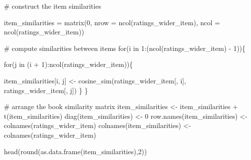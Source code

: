 \documentclass[
]{report}
\newenvironment{Shaded}{\begin{snugshade}}{\end{snugshade}}
\newcommand{\AttributeTok}[1]{\textcolor[rgb]{0.40,0.45,0.13}{#1}}
\newcommand{\CommentTok}[1]{\textcolor[rgb]{0.37,0.37,0.37}{#1}}
\newcommand{\ControlFlowTok}[1]{\textcolor[rgb]{0.00,0.23,0.31}{#1}}
\newcommand{\DecValTok}[1]{\textcolor[rgb]{0.68,0.00,0.00}{#1}}
\newcommand{\FunctionTok}[1]{\textcolor[rgb]{0.28,0.35,0.67}{#1}}
\newcommand{\NormalTok}[1]{\textcolor[rgb]{0.00,0.23,0.31}{#1}}
\newcommand{\OtherTok}[1]{\textcolor[rgb]{0.00,0.23,0.31}{#1}}
\newcommand{\SpecialCharTok}[1]{\textcolor[rgb]{0.37,0.37,0.37}{#1}}
\begin{document}
\begin{Shaded}
\begin{Highlighting}[]
\CommentTok{\# construct the item similarities}

\NormalTok{item\_similarities }\OtherTok{=} \FunctionTok{matrix}\NormalTok{(}\DecValTok{0}\NormalTok{, }\AttributeTok{nrow =} \FunctionTok{ncol}\NormalTok{(ratings\_wider\_item), }\AttributeTok{ncol =} \FunctionTok{ncol}\NormalTok{(ratings\_wider\_item))}
  
  \CommentTok{\# compute similarities between items}
\ControlFlowTok{for}\NormalTok{(i }\ControlFlowTok{in} \DecValTok{1}\SpecialCharTok{:}\NormalTok{(}\FunctionTok{ncol}\NormalTok{(ratings\_wider\_item) }\SpecialCharTok{{-}} \DecValTok{1}\NormalTok{))\{}
  
    \ControlFlowTok{for}\NormalTok{(j }\ControlFlowTok{in}\NormalTok{ (i }\SpecialCharTok{+} \DecValTok{1}\NormalTok{)}\SpecialCharTok{:}\FunctionTok{ncol}\NormalTok{(ratings\_wider\_item))\{}
      
\NormalTok{      item\_similarities[i, j] }\OtherTok{\textless{}{-}} \FunctionTok{cosine\_sim}\NormalTok{(ratings\_wider\_item[, i], ratings\_wider\_item[, j])}
\NormalTok{    \}}
\NormalTok{\}}

\CommentTok{\# arrange the book similarity matrix }
\NormalTok{item\_similarities            }\OtherTok{\textless{}{-}}\NormalTok{ item\_similarities }\SpecialCharTok{+} \FunctionTok{t}\NormalTok{(item\_similarities)}
\FunctionTok{diag}\NormalTok{(item\_similarities)      }\OtherTok{\textless{}{-}} \DecValTok{0}
\FunctionTok{row.names}\NormalTok{(item\_similarities) }\OtherTok{\textless{}{-}} \FunctionTok{colnames}\NormalTok{(ratings\_wider\_item)}
\FunctionTok{colnames}\NormalTok{(item\_similarities)  }\OtherTok{\textless{}{-}} \FunctionTok{colnames}\NormalTok{(ratings\_wider\_item)}

\FunctionTok{head}\NormalTok{(}\FunctionTok{round}\NormalTok{(}\FunctionTok{as.data.frame}\NormalTok{(item\_similarities),}\DecValTok{2}\NormalTok{))}
\end{Highlighting}
\end{Shaded}
\end{document}
